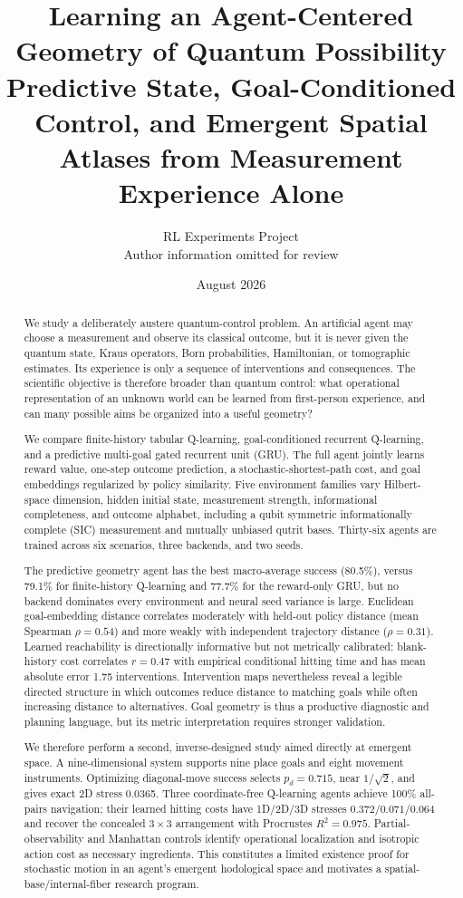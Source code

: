 \documentclass[11pt]{article}
\title{\textbf{Learning an Agent-Centered Geometry of Quantum Possibility}\\
\large Predictive State, Goal-Conditioned Control, and Emergent Spatial Atlases
from Measurement Experience Alone}
\author{RL Experiments Project\\
\small Author information omitted for review}
\date{August 2026}
\begin{document}
\maketitle

\begin{abstract}
We study a deliberately austere quantum-control problem. An artificial agent
may choose a measurement and observe its classical outcome, but it is never
given the quantum state, Kraus operators, Born probabilities, Hamiltonian, or
tomographic estimates. Its experience is only a sequence of interventions and
consequences. The scientific objective is therefore broader than quantum
control: what operational representation of an unknown world can be learned
from first-person experience, and can many possible aims be organized into a
useful geometry?

We compare finite-history tabular Q-learning, goal-conditioned recurrent
Q-learning, and a predictive multi-goal gated recurrent unit (GRU). The full
agent jointly learns reward value, one-step outcome prediction, a
stochastic-shortest-path cost, and goal embeddings regularized by policy
similarity. Five environment families vary Hilbert-space dimension, hidden
initial state, measurement strength, informational completeness, and outcome
alphabet, including a qubit symmetric informationally complete (SIC)
measurement and mutually unbiased qutrit bases. Thirty-six agents are trained
across six scenarios, three backends, and two seeds.

The predictive geometry agent has the best macro-average success (80.5\%),
versus 79.1\% for finite-history Q-learning and 77.7\% for the reward-only GRU,
but no backend dominates every environment and neural seed variance is large.
Euclidean goal-embedding distance correlates moderately with held-out policy
distance (mean Spearman $\rho=0.54$) and more weakly with independent
trajectory distance ($\rho=0.31$). Learned reachability is directionally
informative but not metrically calibrated: blank-history cost correlates
$r=0.47$ with empirical conditional hitting time and has mean absolute error
1.75 interventions. Intervention maps nevertheless reveal a legible directed
structure in which outcomes reduce distance to matching goals while often
increasing distance to alternatives. Goal geometry is thus a productive
diagnostic and planning language, but its metric interpretation requires
stronger validation.

We therefore perform a second, inverse-designed study aimed directly at
emergent space. A nine-dimensional system supports nine place goals and eight
movement instruments. Optimizing diagonal-move success selects $p_d=0.715$,
near $1/\sqrt2$, and gives exact 2D stress 0.0365. Three coordinate-free
Q-learning agents achieve 100\% all-pairs navigation; their learned hitting
costs have 1D/2D/3D stresses $0.372/0.071/0.064$ and recover the concealed
$3\times3$ arrangement with Procrustes $R^2=0.975$. Partial-observability and
Manhattan controls identify operational localization and isotropic action cost
as necessary ingredients. This constitutes a limited existence proof for
stochastic motion in an agent's emergent hodological space and motivates a
spatial-base/internal-fiber research program.


\end{abstract}
\end{document}
